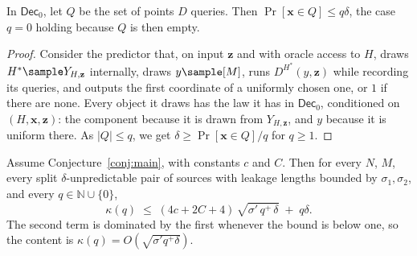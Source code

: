 \documentclass{conjura-conjecture}
\newcommand{\Dec}{\mathsf{Dec}}
\newcommand{\Prob}[1]{\Pr\!\left[#1\right]}
\newcommand{\vx}{\mathbf{x}}
\newcommand{\vz}{\mathbf{z}}
\begin{document}
\begin{lemma}\label{lem:query}
In $\Dec_0$, let $Q$ be the set of points $D$ queries. Then
$\Prob{\vx \in Q} \le q\delta$, the case $q = 0$ holding because $Q$ is then
empty.
\end{lemma}

\begin{proof}
Consider the predictor that, on input $\vz$ and with oracle access to $H$,
draws $H^{*} \sample Y_{H,\vz}$ internally, draws $y \sample [M]$, runs
$D^{H^{*}}(y,\vz)$ while recording its queries, and outputs the first
coordinate of a uniformly chosen one, or $1$ if there are none. Every
object it draws has the law it has in $\Dec_0$, conditioned on
$(H,\vx,\vz)$: the component because it is drawn from $Y_{H,\vz}$, and $y$
because it is uniform there. As $|Q| \le q$, we get $\delta \ge \Prob{\vx \in Q}/q$ for $q \ge 1$.
\end{proof}

\begin{theorem}\label{thm:main}
Assume Conjecture~\ref{conj:main}, with constants $c$ and $C$. Then for
every $N$, $M$, every split $\delta$-unpredictable pair of sources with
leakage lengths bounded by $\sigma_1,\sigma_2$, and every
$q \in \mathbb{N}\cup\{0\}$,
\[
  \kappa(q) \;\le\; (4c + 2C + 4)\,\sqrt{\sigma'\,q^{+}\,\delta} \;+\; q\delta .
\]
The second term is dominated by the first whenever the bound is below one,
so the content is $\kappa(q) = O(\sqrt{\sigma' q^{+}\delta})$.
\end{theorem}
\end{document}
